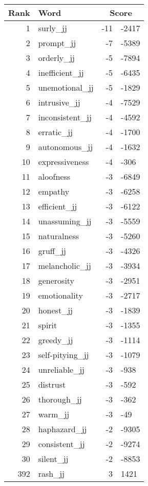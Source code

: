 \begin{longtable}[!htbp]{| rlr@{.}l |}
    \hline
    \textbf{Rank} & \textbf{Word} & \multicolumn{2}{c|}{\textbf{Score}} \\
    \hline
    \endhead
    1 & surly\_jj & -11 & -2417 \\
    2 & prompt\_jj & -7 & -5389 \\
    3 & orderly\_jj & -5 & -7894 \\
    4 & inefficient\_jj & -5 & -6435 \\
    5 & unemotional\_jj & -5 & -1829 \\
    6 & intrusive\_jj & -4 & -7529 \\
    7 & inconsistent\_jj & -4 & -4592 \\
    8 & erratic\_jj & -4 & -1700 \\
    9 & autonomous\_jj & -4 & -1632 \\
    10 & expressiveness & -4 & -306 \\
    11 & aloofness & -3 & -6849 \\
    12 & empathy & -3 & -6258 \\
    13 & efficient\_jj & -3 & -6122 \\
    14 & unassuming\_jj & -3 & -5559 \\
    15 & naturalness & -3 & -5260 \\
    16 & gruff\_jj & -3 & -4326 \\
    17 & melancholic\_jj & -3 & -3934 \\
    18 & generosity & -3 & -2951 \\
    19 & emotionality & -3 & -2717 \\
    20 & honest\_jj & -3 & -1839 \\
    21 & spirit & -3 & -1355 \\
    22 & greedy\_jj & -3 & -1114 \\
    23 & self-pitying\_jj & -3 & -1079 \\
    24 & unreliable\_jj & -3 & -938 \\
    25 & distrust & -3 & -592 \\
    26 & thorough\_jj & -3 & -362 \\
    27 & warm\_jj & -3 & -49 \\
    28 & haphazard\_jj & -2 & -9305 \\
    29 & consistent\_jj & -2 & -9274 \\
    30 & silent\_jj & -2 & -8853 \\
    392 & rash\_jj & 3 & 1421 \\

\end{longtable}

